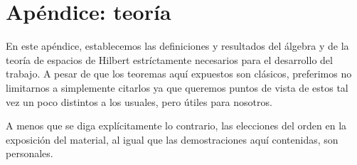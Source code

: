 \appendix 
\chapter{Apéndice: teoría}


En este apéndice, establecemos las
definiciones y resultados
del álgebra y
de la teoría de espacios de Hilbert
estríctamente
necesarios para el desarrollo del trabajo.
A pesar de que los teoremas aquí expuestos son
clásicos, preferimos no limitarnos a simplemente citarlos
ya que queremos puntos de vista de estos tal vez
un poco distintos a los usuales, pero útiles para nosotros.

A menos que se
diga explícitamente lo contrario,
las elecciones del
orden en la exposición del material, 
al igual que las demostraciones
aquí contenidas, son personales. 










